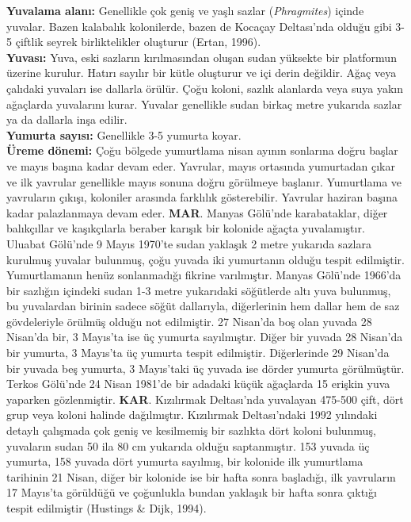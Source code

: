 \documentclass[
  a4paper,
  DIV=11,
  numbers=noendperiod]{scrreprt}
\begin{document}
\textbf{Yuvalama alanı:} Genellikle çok geniş ve yaşlı sazlar
(\emph{Phragmites}) içinde yuvalar. Bazen kalabalık kolonilerde, bazen
de Kocaçay Deltası'nda olduğu gibi 3-5 çiftlik seyrek birliktelikler
oluşturur (Ertan, 1996).\\
\textbf{Yuvası:} Yuva, eski sazların kırılmasından oluşan sudan yüksekte
bir platformun üzerine kurulur. Hatırı sayılır bir kütle oluşturur ve
içi derin değildir. Ağaç veya çalıdaki yuvaları ise dallarla örülür.
Çoğu koloni, sazlık alanlarda veya suya yakın ağaçlarda yuvalarını
kurar. Yuvalar genellikle sudan birkaç metre yukarıda sazlar ya da
dallarla inşa edilir.\\
\textbf{Yumurta sayısı:} Genellikle 3-5 yumurta koyar.\\
\textbf{Üreme dönemi:} Çoğu bölgede yumurtlama nisan ayının sonlarına
doğru başlar ve mayıs başına kadar devam eder. Yavrular, mayıs ortasında
yumurtadan çıkar ve ilk yavrular genellikle mayıs sonuna doğru görülmeye
başlanır. Yumurtlama ve yavruların çıkışı, koloniler arasında farklılık
gösterebilir. Yavrular haziran başına kadar palazlanmaya devam eder.
\textbf{MAR}. Manyas Gölü'nde karabataklar, diğer balıkçıllar ve
kaşıkçılarla beraber karışık bir kolonide ağaçta yuvalamıştır. Uluabat
Gölü'nde 9 Mayıs 1970'te sudan yaklaşık 2 metre yukarıda sazlara
kurulmuş yuvalar bulunmuş, çoğu yuvada iki yumurtanın olduğu tespit
edilmiştir. Yumurtlamanın henüz sonlanmadığı fikrine varılmıştır. Manyas
Gölü'nde 1966'da bir sazlığın içindeki sudan 1-3 metre yukarıdaki
söğütlerde altı yuva bulunmuş, bu yuvalardan birinin sadece söğüt
dallarıyla, diğerlerinin hem dallar hem de saz gövdeleriyle örülmüş
olduğu not edilmiştir. 27 Nisan'da boş olan yuvada 28 Nisan'da bir, 3
Mayıs'ta ise üç yumurta sayılmıştır. Diğer bir yuvada 28 Nisan'da bir
yumurta, 3 Mayıs'ta üç yumurta tespit edilmiştir. Diğerlerinde 29
Nisan'da bir yuvada beş yumurta, 3 Mayıs'taki üç yuvada ise dörder
yumurta görülmüştür. Terkos Gölü'nde 24 Nisan 1981'de bir adadaki küçük
ağaçlarda 15 erişkin yuva yaparken gözlenmiştir. \textbf{KAR}.
Kızılırmak Deltası'nda yuvalayan 475-500 çift, dört grup veya koloni
halinde dağılmıştır. Kızılırmak Deltası'ndaki 1992 yılındaki detaylı
çalışmada çok geniş ve kesilmemiş bir sazlıkta dört koloni bulunmuş,
yuvaların sudan 50 ila 80 cm yukarıda olduğu saptanmıştır. 153 yuvada üç
yumurta, 158 yuvada dört yumurta sayılmış, bir kolonide ilk yumurtlama
tarihinin 21 Nisan, diğer bir kolonide ise bir hafta sonra başladığı,
ilk yavruların 17 Mayıs'ta görüldüğü ve çoğunlukla bundan yaklaşık bir
hafta sonra çıktığı tespit edilmiştir (Hustings \& Dijk, 1994).
\end{document}
